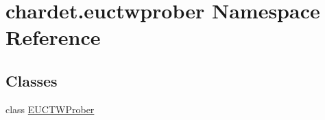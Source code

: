 \hypertarget{namespacechardet_1_1euctwprober}{}\section{chardet.\+euctwprober Namespace Reference}
\label{namespacechardet_1_1euctwprober}
\subsection*{Classes}
\begin{DoxyCompactItemize}
\item 
class \hyperlink{classchardet_1_1euctwprober_1_1_e_u_c_t_w_prober}{E\+U\+C\+T\+W\+Prober}
\end{DoxyCompactItemize}
